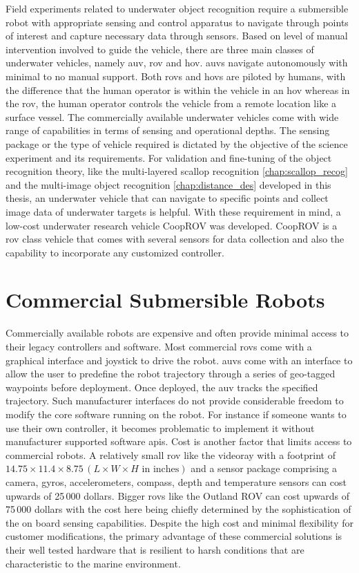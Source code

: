 \documentclass {udthesis}
\begin{document}
Field experiments related to underwater object recognition require a submersible robot with appropriate sensing and control apparatus to navigate through points of interest and capture necessary data through sensors. Based on level of manual intervention involved to guide the vehicle, there are three main classes of underwater vehicles, namely \gls{auv}, \gls{rov} and \gls{hov}. \gls{auv}s navigate autonomously with minimal to no manual support. Both \gls{rov}s and \gls{hov}s are piloted by humans, with the difference that the human operator is within the vehicle in an \gls{hov} whereas in the \gls{rov}, the human operator controls the vehicle from a remote location like a surface vessel. The commercially available underwater vehicles come with wide range of capabilities in terms of sensing and operational depths. The sensing package or the type of vehicle required is dictated by the objective of the science experiment and its requirements. For validation and fine-tuning of the object recognition theory, 
like 
the multi-layered scallop recognition \ref{chap:scallop_recog} and the multi-image object recognition \ref{chap:distance_des} developed in this thesis, an underwater vehicle that can navigate to specific points and collect image data of underwater targets is helpful. With these requirement in mind, a low-cost underwater research vehicle CoopROV was developed. CoopROV is a \gls{rov} class vehicle that comes with several sensors for data collection and also the capability to incorporate any customized controller.

\section{Commercial Submersible Robots}

Commercially available robots are expensive and often provide minimal access to their legacy controllers and software. Most commercial \gls{rov}s come with a graphical interface and joystick to drive the robot. \gls{auv}s come with an interface to allow the user to predefine the robot trajectory through a series of geo-tagged waypoints before deployment. Once deployed, the \gls{auv} tracks the specified trajectory. Such manufacturer interfaces do not provide considerable freedom to modify the core software running on the robot. For instance if someone wants to use their own controller, it becomes problematic to implement it without manufacturer supported software \gls{api}s. Cost is another factor that limits access to commercial robots. A relatively small \gls{rov} like the videoray \cite{videoray} with a footprint of $14.75\times 11.4\times 8.75 \,(L\times W\times H \text{ in inches})$ and a sensor package comprising a camera, gyros, accelerometers, compass, depth and temperature sensors can cost 
upwards of 25\,000 dollars. Bigger \gls{rov}s like the Outland ROV\cite{outlandrov} can cost upwards of 75\,000 dollars with the cost here being chiefly determined by the sophistication of the on board sensing capabilities. Despite the high cost and minimal flexibility for customer modifications, the primary advantage of these commercial solutions is their well tested hardware that is resilient to harsh conditions that are characteristic to the marine environment.
\end{document}
